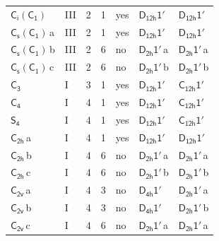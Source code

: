 \documentclass[10pt,a4paper]{article}
\numberwithin{equation}{section}
\newcommand{\grp}[1]{\mathsf{#1}}
\newcommand{\clsletter}[1]{\,{\scriptsize\color{black!55}#1}}
\begin{document}
{\begin{longtable}{@{}llrrlll@{}}
\href{S2-C1.pdf}{$\grp{C_{i}}(\grp{C_{1}})$} & III & 2 & 1 & yes & \href{D12h-1p.pdf}{$\grp{D_{12h}1'}$} & \href{D12h-1p.pdf}{$\grp{D_{12h}1'}$}\\
\href{C1v-C1.pdf}{$\grp{C_{s}}(\grp{C_{1}})$}\clsletter{a} & III & 2 & 1 & yes & \href{D12h-1p.pdf}{$\grp{D_{12h}1'}$} & \href{D12h-1p.pdf}{$\grp{D_{12h}1'}$}\\
\href{C1v-C1.pdf}{$\grp{C_{s}}(\grp{C_{1}})$}\clsletter{b} & III & 2 & 6 & no & \href{D2h-1p.pdf}{$\grp{D_{2h}1'}$}\clsletter{a} & \href{D2h-1p.pdf}{$\grp{D_{2h}1'}$}\clsletter{a}\\
\href{C1v-C1.pdf}{$\grp{C_{s}}(\grp{C_{1}})$}\clsletter{c} & III & 2 & 6 & no & \href{D2h-1p.pdf}{$\grp{D_{2h}1'}$}\clsletter{b} & \href{D2h-1p.pdf}{$\grp{D_{2h}1'}$}\clsletter{b}\\
\href{../../../rotation/data/pdf/C3.pdf}{$\grp{C_{3}}$} & I & 3 & 1 & yes & \href{D12h-1p.pdf}{$\grp{D_{12h}1'}$} & \href{C12h-1p.pdf}{$\grp{C_{12h}1'}$}\\
\href{../../../rotation/data/pdf/C4.pdf}{$\grp{C_{4}}$} & I & 4 & 1 & yes & \href{D12h-1p.pdf}{$\grp{D_{12h}1'}$} & \href{C12h-1p.pdf}{$\grp{C_{12h}1'}$}\\
\href{../../../rotation/data/pdf/S4.pdf}{$\grp{S_{4}}$} & I & 4 & 1 & yes & \href{D12h-1p.pdf}{$\grp{D_{12h}1'}$} & \href{C12h-1p.pdf}{$\grp{C_{12h}1'}$}\\
\href{../../../rotation/data/pdf/C2h.pdf}{$\grp{C_{2h}}$}\clsletter{a} & I & 4 & 1 & yes & \href{D12h-1p.pdf}{$\grp{D_{12h}1'}$} & \href{D12h-1p.pdf}{$\grp{D_{12h}1'}$}\\
\href{../../../rotation/data/pdf/C2h.pdf}{$\grp{C_{2h}}$}\clsletter{b} & I & 4 & 6 & no & \href{D2h-1p.pdf}{$\grp{D_{2h}1'}$}\clsletter{a} & \href{D2h-1p.pdf}{$\grp{D_{2h}1'}$}\clsletter{a}\\
\href{../../../rotation/data/pdf/C2h.pdf}{$\grp{C_{2h}}$}\clsletter{c} & I & 4 & 6 & no & \href{D2h-1p.pdf}{$\grp{D_{2h}1'}$}\clsletter{b} & \href{D2h-1p.pdf}{$\grp{D_{2h}1'}$}\clsletter{b}\\
\href{../../../rotation/data/pdf/C2v.pdf}{$\grp{C_{2v}}$}\clsletter{a} & I & 4 & 3 & no & \href{D4h-1p.pdf}{$\grp{D_{4h}1'}$} & \href{D2h-1p.pdf}{$\grp{D_{2h}1'}$}\clsletter{a}\\
\href{../../../rotation/data/pdf/C2v.pdf}{$\grp{C_{2v}}$}\clsletter{b} & I & 4 & 3 & no & \href{D4h-1p.pdf}{$\grp{D_{4h}1'}$} & \href{D2h-1p.pdf}{$\grp{D_{2h}1'}$}\clsletter{b}\\
\href{../../../rotation/data/pdf/C2v.pdf}{$\grp{C_{2v}}$}\clsletter{c} & I & 4 & 6 & no & \href{D2h-1p.pdf}{$\grp{D_{2h}1'}$}\clsletter{a} & \href{D2h-1p.pdf}{$\grp{D_{2h}1'}$}\clsletter{a}\\

\end{longtable}}
\end{document}
